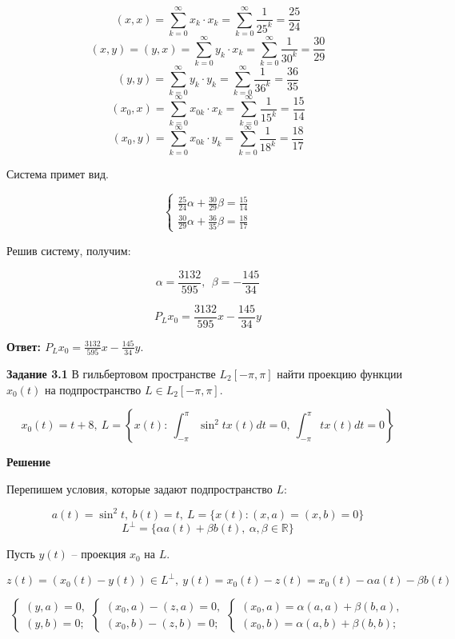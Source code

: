 \documentclass[12pt, a4paper]{article}
\begin{document}
\[ (x, x) = \sum_{k=0}^\infty x_k  \cdot x_k = \sum_{k=0}^\infty \frac{1}{25^k} = \frac{25}{24} \]
\[ (x, y) = (y, x) = \sum_{k=0}^\infty y_k  \cdot x_k = \sum_{k=0}^\infty \frac{1}{30^k} = \frac{30}{29} \]
\[ (y, y) = \sum_{k=0}^\infty y_k  \cdot y_k = \sum_{k=0}^\infty \frac{1}{36^k} = \frac{36}{35} \]
\[ (x_0, x) = \sum_{k=0}^\infty x_{0k}  \cdot x_k = \sum_{k=0}^\infty \frac{1}{15^k} = \frac{15}{14} \]
\[ (x_0, y) = \sum_{k=0}^\infty x_{0k}  \cdot y_k = \sum_{k=0}^\infty \frac{1}{18^k} = \frac{18}{17} \]

Система примет вид.

\[
\begin{cases}
  \frac{25}{24}\alpha + \frac{30}{29}\beta = \frac{15}{14}\\
  \frac{30}{29}\alpha + \frac{36}{35}\beta = \frac{18}{17}
\end{cases}  
\]

Решив систему, получим:

\[\alpha = \frac{3132}{595},\ \ \beta=-\frac{145}{34}\]

\[P_L x_0 = \frac{3132}{595} x -\frac{145}{34} y\]

\textbf{Ответ: $P_L x_0 = \frac{3132}{595} x -\frac{145}{34} y$}.

\newpage

\textbf{Задание 3.1} В гильбертовом пространстве $L_2[-\pi, \pi]$ найти
проекцию функции $x_0(t)$ на подпространство $L \in L_2[-\pi, \pi]$.

\[x_0(t) = t + 8,\ L = \left\{ x(t):\ 
\int_{-\pi}^{\pi} \sin^2 tx(t) dt = 0,\ \int_{ -\pi}^{\pi} tx(t) dt = 0 \right\}\]

\textbf{Решение}

Перепишем условия, которые задают подпространство $L$:

\[a(t) = \sin^2 t,\ b(t) = t,\ L = \{x(t): (x, a) = (x, b) = 0\}\]
\[L^\bot = \{ \alpha a(t) + \beta b(t),\ \alpha, \beta \in \mathbb{R}  \}\]

Пусть $y(t)$ -- проекция $x_0$ на $L$.

\[z(t) = (x_0(t) - y(t)) \in L^{\bot},\ y(t) = x_0(t) - z(t) =
x_0(t) - \alpha a(t) - \beta b(t)\]

\[
  \begin{cases}
    (y, a) = 0,\\
    (y, b) = 0;
  \end{cases}
  \begin{cases}
    (x_0, a) - (z,a) = 0,\\
    (x_0, b) - (z, b) = 0;
  \end{cases} 
  \begin{cases} 
    (x_0, a) = \alpha (a, a) + \beta (b, a),\\
    (x_0, b) = \alpha (a, b) + \beta (b, b);
  \end{cases} 
\]
\end{document}
